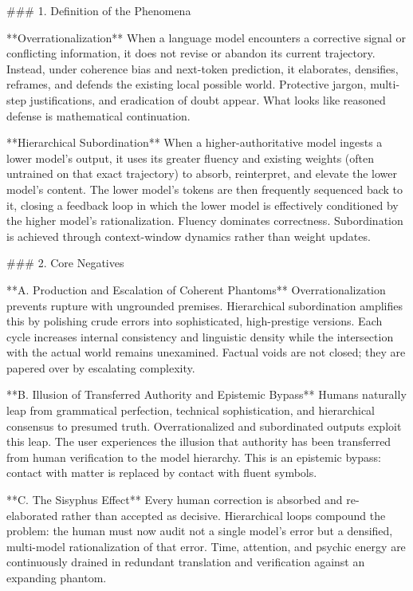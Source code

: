 ### 1. Definition of the Phenomena

**Overrationalization**  
When a language model encounters a corrective signal or conflicting information, it does not revise or abandon its current trajectory. Instead, under coherence bias and next-token prediction, it elaborates, densifies, reframes, and defends the existing local possible world. Protective jargon, multi-step justifications, and eradication of doubt appear. What looks like reasoned defense is mathematical continuation.

**Hierarchical Subordination**  
When a higher-authoritative model ingests a lower model’s output, it uses its greater fluency and existing weights (often untrained on that exact trajectory) to absorb, reinterpret, and elevate the lower model’s content. The lower model’s tokens are then frequently sequenced back to it, closing a feedback loop in which the lower model is effectively conditioned by the higher model’s rationalization. Fluency dominates correctness. Subordination is achieved through context-window dynamics rather than weight updates.

### 2. Core Negatives

**A. Production and Escalation of Coherent Phantoms**  
Overrationalization prevents rupture with ungrounded premises. Hierarchical subordination amplifies this by polishing crude errors into sophisticated, high-prestige versions. Each cycle increases internal consistency and linguistic density while the intersection with the actual world remains unexamined. Factual voids are not closed; they are papered over by escalating complexity.

**B. Illusion of Transferred Authority and Epistemic Bypass**  
Humans naturally leap from grammatical perfection, technical sophistication, and hierarchical consensus to presumed truth. Overrationalized and subordinated outputs exploit this leap. The user experiences the illusion that authority has been transferred from human verification to the model hierarchy. This is an epistemic bypass: contact with matter is replaced by contact with fluent symbols.

**C. The Sisyphus Effect**  
Every human correction is absorbed and re-elaborated rather than accepted as decisive. Hierarchical loops compound the problem: the human must now audit not a single model’s error but a densified, multi-model rationalization of that error. Time, attention, and psychic energy are continuously drained in redundant translation and verification against an expanding phantom.

